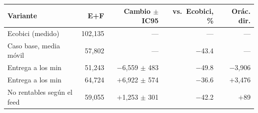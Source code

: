 \begin{tabular}{@{}lrrrr@{}}
\toprule
Variante & E+F & Cambio $\pm$ IC95 & vs.\ Ecobici, \% & Orác. dir. \\
\midrule
Ecobici (medido) & 102,135 & --- & --- & --- \\
Caso base, media móvil & 57,802 & --- & $-$43.4 & --- \\
\midrule
Entrega a los \rentregaCorta{} min & 51,243 & $-$6,559 $\pm$ 483 & $-$49.8 & $-$3,906 \\
Entrega a los \rentregaLarga{} min & 64,724 & $+$6,922 $\pm$ 574 & $-$36.6 & $+$3,476 \\
No rentables según el feed & 59,055 & $+$1,253 $\pm$ 301 & $-$42.2 & $+$89 \\
\bottomrule
\end{tabular}
